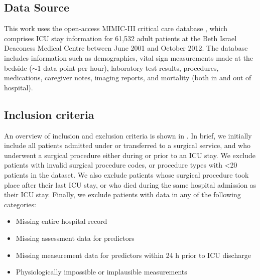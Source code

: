 \documentclass[onecolumn]{article}
\begin{document}
\subsection{Data Source}

This work uses the open-access MIMIC-III critical care database \citep{Johnson2016}, which comprises ICU stay information for 61,532 adult patients at the Beth Israel Deaconess Medical Centre between June 2001 and October 2012. The database includes information such as demographics, vital sign measurements made at the bedside ($\sim$1 data point per hour), laboratory test results, procedures, medications, caregiver notes, imaging reports, and mortality (both in and out of hospital).

\subsection{Inclusion criteria}

An overview of inclusion and exclusion criteria is shown in . In brief, we initially include all patients admitted under or transferred to a surgical service, and who underwent a surgical procedure either during or prior to an ICU stay. We exclude patients with invalid surgical procedure codes, or procedure types with <20 patients in the dataset. We also exclude patients whose surgical procedure took place after their last ICU stay, or who died during the same hospital admission as their ICU stay. Finally, we exclude patients with data in any of the following categories:

\begin{itemize}
\item Missing entire hospital record
\item Missing assessment data for predictors
\item Missing measurement data for predictors within 24 h prior to ICU discharge
\item Physiologically impossible or implausible measurements
\end{itemize}
\end{document}
